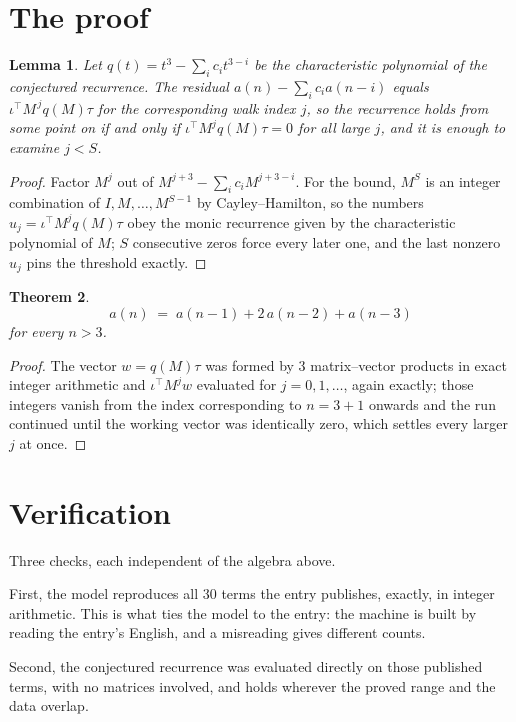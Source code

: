 \documentclass[11pt,a4paper]{article}
\theoremstyle{plain}
\newtheorem{theorem}{Theorem}
\newtheorem{lemma}[theorem]{Lemma}
\theoremstyle{definition}
\begin{document}
\section{The proof}

\begin{lemma}\label{lem:crit}
Let $q(t)=t^{3}-\sum_i c_it^{3-i}$ be the characteristic polynomial of the
conjectured recurrence. The residual $a(n)-\sum_ic_ia(n-i)$ equals
$\iota^{\!\top}M^{\,j}q(M)\tau$ for the corresponding walk index $j$, so the recurrence
holds from some point on if and only if $\iota^{\!\top}M^{j}q(M)\tau=0$ for all large $j$,
and it is enough to examine $j<S$.
\end{lemma}

\begin{proof}
Factor $M^{j}$ out of $M^{j+3}-\sum_ic_iM^{j+3-i}$. For the bound, $M^{S}$
is an integer combination of $I,M,\dots,M^{S-1}$ by Cayley--Hamilton, so the numbers
$u_j=\iota^{\!\top}M^{j}q(M)\tau$ obey the monic recurrence given by the characteristic
polynomial of $M$; $S$ consecutive zeros force every later one, and the last nonzero $u_j$
pins the threshold exactly.
\end{proof}

\begin{theorem}
\[
a(n)\;=\;a(n-1) + 2\,a(n-2) + a(n-3)
\]
for every $n>3$.
\end{theorem}

\begin{proof}
The vector $w=q(M)\tau$ was formed by $3$ matrix--vector products in exact integer
arithmetic and $\iota^{\!\top}M^{j}w$ evaluated for $j=0,1,\dots$, again exactly; those
integers vanish from the index corresponding to $n=3+1$ onwards and the run continued
until the working vector was identically zero, which settles every larger $j$ at once.
\end{proof}

\section{Verification}

Three checks, each independent of the algebra above.

First, the model reproduces all $30$ terms the entry publishes, exactly, in integer
arithmetic. This is what ties the model to the entry: the machine is built by reading the
entry's English, and a misreading gives different counts.

Second, the conjectured recurrence was evaluated directly on those published terms, with no
matrices involved, and holds wherever the proved range and the data overlap.
\end{document}
